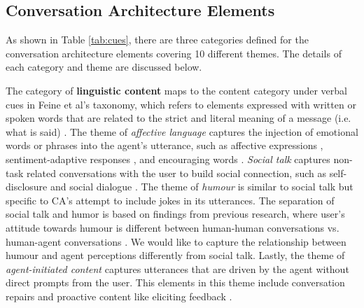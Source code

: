 \documentclass[sigconf,screen,review, anonymous]{acmart}
\newcommand{\cmt}[1]{}%
\begin{document}
\subsection{Conversation Architecture Elements}

As shown in Table \ref{tab:cues}, there are three categories defined for the conversation architecture elements covering 10 different themes. The details of each category and theme are discussed below.

The category of \textbf{linguistic content} maps to the content category under verbal cues in Feine et al's taxonomy, which refers to elements expressed with written or spoken words that are related to the strict and literal meaning of a message (i.e. what is said) \cite{feine2019taxonomy}. The theme of \textit{affective language} captures the injection of emotional words or phrases into the agent's utterance, such as affective expressions \cite{seeger2021chatbots}\cmt{[35]}\cite{yang2017perceived}\cmt{[44]}\cite{zhu2022effects}\cmt{[26]}, sentiment-adaptive responses \cite{diederich2019emulating}\cmt{[25]}, and encouraging words \cite{healey2013relating}\cmt{[39]}. \textit{Social talk} captures non-task related conversations with the user to build social connection, such as self-disclosure \cite{lee2020hear}\cmt{[23]} and social dialogue \cite{volkel2021manipulating}\cmt{[68]}\cite{lubold2016effects}\cmt{[86]}. The theme of \textit{humour} is similar to social talk but specific to CA's attempt to include jokes in its utterances. The separation of social talk and humor is based on findings from previous research, where user's attitude towards humour is different between human-human conversations vs. human-agent conversations \cite{clark2019makes}. We would like to capture the relationship between humour and agent perceptions differently from social talk. Lastly, the theme of \textit{agent-initiated content} captures utterances that are driven by the agent without direct prompts from the user. This elements in this theme include conversation repairs \cite{cuadra2021my}\cmt{[67]}\cite{ashktorab2019resilient}\cmt{[88]} and proactive content like eliciting feedback \cite{xiao2021let}\cmt{[73]}.
\end{document}
